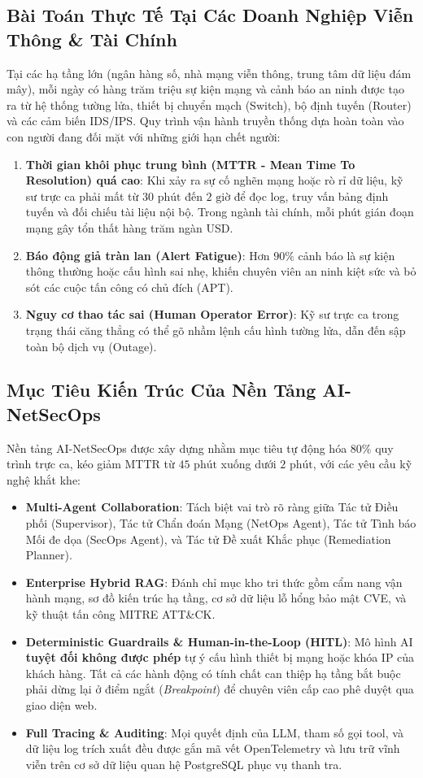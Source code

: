 \subsection{Bài Toán Thực Tế Tại Các Doanh Nghiệp Viễn Thông \& Tài Chính}
Tại các hạ tầng lớn (ngân hàng số, nhà mạng viễn thông, trung tâm dữ liệu đám mây), mỗi ngày có hàng trăm triệu sự kiện mạng và cảnh báo an ninh được tạo ra từ hệ thống tường lửa, thiết bị chuyển mạch (Switch), bộ định tuyến (Router) và các cảm biến IDS/IPS.
Quy trình vận hành truyền thống dựa hoàn toàn vào con người đang đối mặt với những giới hạn chết người:
\begin{enumerate}
  \item \textbf{Thời gian khôi phục trung bình (MTTR - Mean Time To Resolution) quá cao}: Khi xảy ra sự cố nghẽn mạng hoặc rò rỉ dữ liệu, kỹ sư trực ca phải mất từ $30\text{ phút}$ đến $2\text{ giờ}$ để đọc log, truy vấn bảng định tuyến và đối chiếu tài liệu nội bộ. Trong ngành tài chính, mỗi phút gián đoạn mạng gây tổn thất hàng trăm ngàn USD.
  \item \textbf{Báo động giả tràn lan (Alert Fatigue)}: Hơn $90\%$ cảnh báo là sự kiện thông thường hoặc cấu hình sai nhẹ, khiến chuyên viên an ninh kiệt sức và bỏ sót các cuộc tấn công có chủ đích (APT).
  \item \textbf{Nguy cơ thao tác sai (Human Operator Error)}: Kỹ sư trực ca trong trạng thái căng thẳng có thể gõ nhầm lệnh cấu hình tường lửa, dẫn đến sập toàn bộ dịch vụ (Outage).
\end{enumerate}

\subsection{Mục Tiêu Kiến Trúc Của Nền Tảng AI-NetSecOps}
Nền tảng AI-NetSecOps được xây dựng nhằm mục tiêu tự động hóa $80\%$ quy trình trực ca, kéo giảm MTTR từ $45\text{ phút}$ xuống dưới $2\text{ phút}$, với các yêu cầu kỹ nghệ khắt khe:
\begin{itemize}
  \item \textbf{Multi-Agent Collaboration}: Tách biệt vai trò rõ ràng giữa Tác tử Điều phối (Supervisor), Tác tử Chẩn đoán Mạng (NetOps Agent), Tác tử Tình báo Mối đe dọa (SecOps Agent), và Tác tử Đề xuất Khắc phục (Remediation Planner).
  \item \textbf{Enterprise Hybrid RAG}: Đánh chỉ mục kho tri thức gồm cẩm nang vận hành mạng, sơ đồ kiến trúc hạ tầng, cơ sở dữ liệu lỗ hổng bảo mật CVE, và kỹ thuật tấn công MITRE ATT\&CK.
  \item \textbf{Deterministic Guardrails \& Human-in-the-Loop (HITL)}: Mô hình AI \textbf{tuyệt đối không được phép} tự ý cấu hình thiết bị mạng hoặc khóa IP của khách hàng. Tất cả các hành động có tính chất can thiệp hạ tầng bắt buộc phải dừng lại ở điểm ngắt (\textit{Breakpoint}) để chuyên viên cấp cao phê duyệt qua giao diện web.
  \item \textbf{Full Tracing \& Auditing}: Mọi quyết định của LLM, tham số gọi tool, và dữ liệu log trích xuất đều được gắn mã vết OpenTelemetry và lưu trữ vĩnh viễn trên cơ sở dữ liệu quan hệ PostgreSQL phục vụ thanh tra.
\end{itemize}

